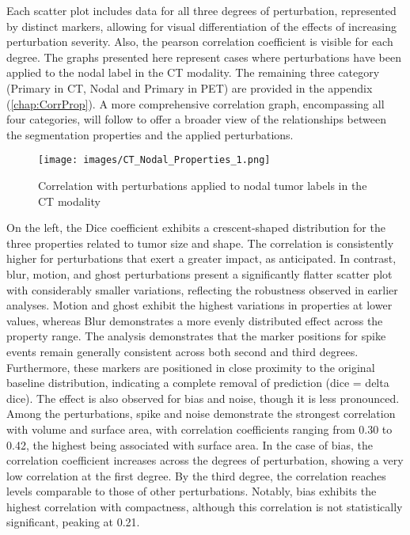 Each scatter plot includes data for all three degrees of perturbation, represented by distinct markers, allowing for visual differentiation of the effects of increasing perturbation severity. Also, the pearson correlation coefficient is visible for each degree.
The graphs presented here represent cases where perturbations have been applied to the nodal label in the CT modality. 
The remaining three category (Primary in CT, Nodal and Primary in PET) are provided in the appendix (\ref{chap:CorrProp}). A more comprehensive correlation graph, encompassing all 
four categories, will follow to offer a broader view of the relationships between the segmentation properties and the applied perturbations.
\begin{figure}[ht]
    \centering
    \texttt{[image: images/CT\_Nodal\_Properties\_1.png]}
    \caption{Correlation with perturbations applied to nodal tumor labels in the CT modality}
    \label{fig:three_subfigures}
\end{figure}

On the left, the Dice coefficient exhibits a crescent-shaped distribution for the three properties related to tumor size and shape. The correlation is consistently higher for perturbations that exert a greater impact, as anticipated. In contrast, blur, motion, and ghost perturbations present a significantly flatter scatter plot with considerably smaller variations, reflecting the robustness observed in earlier analyses. 
Motion and ghost exhibit the highest variations in properties at lower values, whereas Blur demonstrates a more evenly distributed effect across the property range.
The analysis demonstrates that the marker positions for spike events remain generally consistent across both second and third degrees. Furthermore, these markers are positioned in close proximity to the original baseline distribution, indicating a complete removal of prediction (dice = delta dice). The effect is also observed for bias and noise, though it is less pronounced.
Among the perturbations, spike and noise demonstrate the strongest correlation with volume and surface area, with correlation coefficients ranging from 0.30 to 0.42, the highest being associated with surface area. 
\newpage
In the case of bias, the correlation coefficient increases across the degrees of perturbation, showing a very low correlation at the first degree. By the third degree, the correlation reaches levels comparable to those of other perturbations. Notably, bias exhibits the highest correlation with compactness, although this correlation is not statistically significant, peaking at 0.21.


